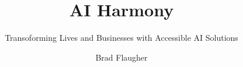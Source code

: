 \documentclass[
    letterpaper, %
    fontsize=10pt, %
    twoside=false, %
	numbers=noenddot, %
]{kaobook}
\begin{document}



%



\titlehead{}
\subject{}

\title[AI Harmony]{AI Harmony}
\subtitle{Transoforming Lives and Businesses with Accessible AI Solutions}

\author[Brad Flaugher]{Brad Flaugher}

\date{}

\publishers{\texttt{[image: publogo]}}


\frontmatter %



\end{document}
